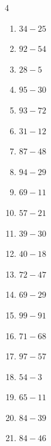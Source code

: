 \begin{multicols}{4}
\begin{enumerate}
  \item $34-25$
        \phantom{$=9$}

  \item $92-54$
        \phantom{$=38$}

\columnbreak %

\resetques

  \item $28-5$
        \phantom{$=23$}

  \item $95-30$
        \phantom{$=65$}

  \item $93-72$
        \phantom{$=21$}

  \item $31-12$
        \phantom{$=19$}

  \item $87-48$
        \phantom{$=39$}

  \item $94-29$
        \phantom{$=65$}

  \item $69-11$
        \phantom{$=58$}

  \item $57-21$
        \phantom{$=36$}

  \item $39-30$
        \phantom{$=9$}

  \item $40-18$
        \phantom{$=22$}

  \item $72-47$
        \phantom{$=25$}

  \item $69-29$
        \phantom{$=40$}

  \item $99-91$
        \phantom{$=8$}

  \item $71-68$
        \phantom{$=3$}

  \item $97-57$
        \phantom{$=40$}

  \item $54-3$
        \phantom{$=51$}

  \item $65-11$
        \phantom{$=54$}

  \item $84-39$
        \phantom{$=45$}

  \item $84-46$
        \phantom{$=38$}


\end{enumerate}
\end{multicols}

